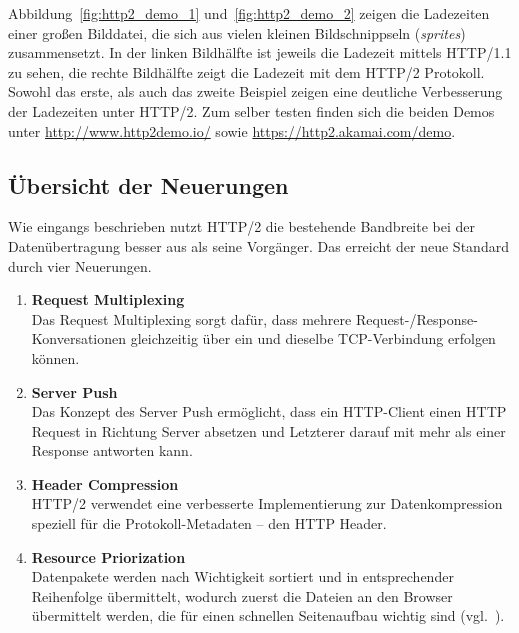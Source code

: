 \documentclass[a4paper, justified, notoc]{tufte-handout} %
\begin{document}
Abbildung~\ref{fig:http2_demo_1} und~\ref{fig:http2_demo_2} zeigen die Ladezeiten einer großen Bilddatei, die sich aus vielen kleinen Bildschnippseln (\emph{sprites}) zusammensetzt. In der linken Bildhälfte ist jeweils  die Ladezeit mittels HTTP/1.1 zu sehen, die rechte Bildhälfte zeigt die Ladezeit mit dem HTTP/2 Protokoll. Sowohl das erste, als auch das zweite Beispiel zeigen eine deutliche Verbesserung der Ladezeiten unter HTTP/2.
Zum selber testen finden sich die beiden Demos unter \url{http://www.http2demo.io/} sowie \url{https://http2.akamai.com/demo}.


\subsection{Übersicht der Neuerungen} %
\label{sub:neuerungen}
Wie eingangs beschrieben nutzt HTTP/2 die bestehende Bandbreite bei der Datenübertragung besser aus als seine Vorgänger. Das erreicht der neue Standard durch vier Neuerungen. 
\begin{enumerate}
	\item \textbf{Request Multiplexing} \\ Das Request Multiplexing sorgt dafür, dass mehrere Request-/Response-Konversationen gleichzeitig über ein und dieselbe TCP-Verbindung erfolgen können.
	\item \textbf{Server Push} \\ Das Konzept des Server Push ermöglicht, dass ein HTTP-Client einen HTTP Request in Richtung Server absetzen und Letzterer darauf mit mehr als einer Response antworten kann.
	\item \textbf{Header Compression} \\ HTTP/2 verwendet eine verbesserte Implementierung zur Datenkompression speziell für die Protokoll-Metadaten -- den HTTP Header.
	\item \textbf{Resource Priorization} \\ Datenpakete werden nach Wichtigkeit sortiert und in entsprechender Reihenfolge übermittelt, wodurch zuerst die Dateien an den Browser übermittelt werden, die für einen schnellen Seitenaufbau wichtig sind (vgl.~\cite{mueller:2015}). 
\end{enumerate}
\end{document}
